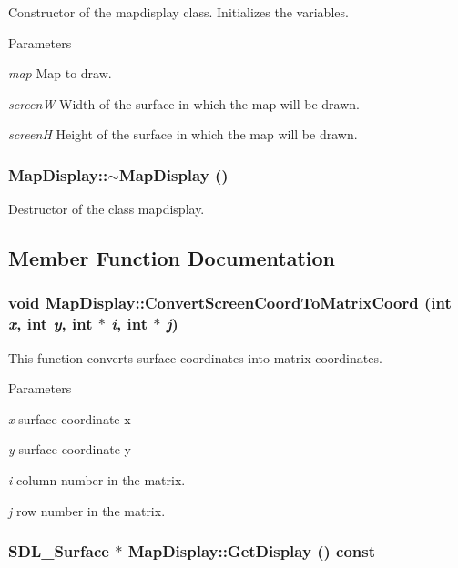 Constructor of the mapdisplay class. Initializes the variables. 


\begin{DoxyParams}{Parameters}
\item[{\em map}]Map to draw. \item[{\em screenW}]Width of the surface in which the map will be drawn. \item[{\em screenH}]Height of the surface in which the map will be drawn. \end{DoxyParams}
\hypertarget{classMapDisplay_a95dc44c5a18970df2131eeb10b59cd21}{
\subsubsection[{$\sim$MapDisplay}]{\setlength{\rightskip}{0pt plus 5cm}MapDisplay::$\sim$MapDisplay ()}}
\label{classMapDisplay_a95dc44c5a18970df2131eeb10b59cd21}


Destructor of the class mapdisplay. 



\subsection{Member Function Documentation}
\hypertarget{classMapDisplay_afd0ef9d9c11103bd966d27a12cd84ed7}{
\subsubsection[{ConvertScreenCoordToMatrixCoord}]{\setlength{\rightskip}{0pt plus 5cm}void MapDisplay::ConvertScreenCoordToMatrixCoord (int {\em x}, \/  int {\em y}, \/  int $\ast$ {\em i}, \/  int $\ast$ {\em j})}}
\label{classMapDisplay_afd0ef9d9c11103bd966d27a12cd84ed7}


This function converts surface coordinates into matrix coordinates. 


\begin{DoxyParams}{Parameters}
\item[{\em x}]surface coordinate x \item[{\em y}]surface coordinate y \item[{\em i}]column number in the matrix. \item[{\em j}]row number in the matrix. \end{DoxyParams}
\hypertarget{classMapDisplay_a346dbbf98f1ab76cddab55dfb9c07b27}{
\subsubsection[{GetDisplay}]{\setlength{\rightskip}{0pt plus 5cm}SDL\_\-Surface $\ast$ MapDisplay::GetDisplay () const}}
\label{classMapDisplay_a346dbbf98f1ab76cddab55dfb9c07b27}


